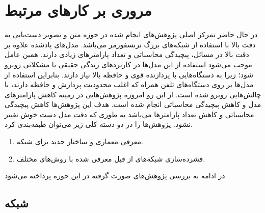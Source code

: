 \chapter{مروری بر کار‌های مرتبط}
\thispagestyle{empty}

در حال حاضر تمرکز اصلی پژوهش‌های انجام شده در حوزه متن و تصویر دست‌یابی به دقت بالا با استفاده از شبکه‌های بزرگ ترنسفورمر می‌باشد. مدل‌های یادشده علاوه بر دقت بالا در مسائل، پیچیدگی محاسباتی و تعداد پارامتر‌های زیادی دارند. همین عامل موجب می‌شود استفاده از این مدل‌ها در کاربرد‌های زندگی حقیقی با مشکلاتی روبرو شود؛ زیرا به دستگاه‌هایی با پردازنده قوی و حافظه بالا نیاز دارند. بنابراین استفاده از مدل‌ها بر روی دستگاه‌های تلفن همراه که اغلب محدودیت پردازش و حافظه دارند، با چالش‌هایی روبرو شده است. 
\newline
از این رو امروزه پژوهش‌هایی در زمینه کاهش پارامتر‌های مدل و کاهش پیچیدگی محاسباتی انجام شده است. هدف این پژوهش‌ها کاهش پیچیدگی محاسباتی و کاهش تعداد پارامتر‌ها می‌باشد به طوری که دقت مدل دست خوش تغییر نشود. پژوهش‌ها را در دو دسته کلی زیر می‌توان طبقه‌بندی کرد. 
\begin{enumerate}
	\item معرفی معماری و ساختار جدید برای شبکه.
	\item فشرده‌سازی شبکه‌های از قبل معرفی شده با روش‌‌های مختلف.
\end{enumerate}
در ادامه به بررسی پژوهش‌های صورت گرفته در این حوزه پرداخته می‌شود.
\section{شبکه
	}

